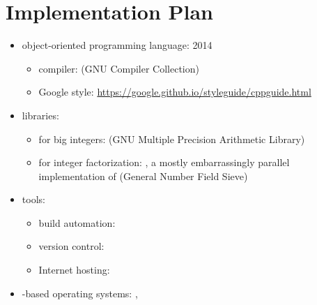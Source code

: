 \section{Implementation Plan}


\begin{itemize}
\item object-oriented programming language:  2014
  \begin{itemize}
  \item compiler:  (GNU Compiler Collection)
  \item Google style:
    \url{https://google.github.io/styleguide/cppguide.html}
  \end{itemize}
\item libraries:
  \begin{itemize}
  \item for big integers: 
    (GNU Multiple Precision Arithmetic Library)
  \item for integer factorization: ,
    a mostly embarrassingly parallel
    implementation of 
    (General Number Field Sieve)
  \end{itemize}
\item tools:
  \begin{itemize}
  \item build automation: 
  \item version control: 
  \item Internet hosting: \crygithub
  \end{itemize}
\item {}-based operating systems:
  , 
\end{itemize}
